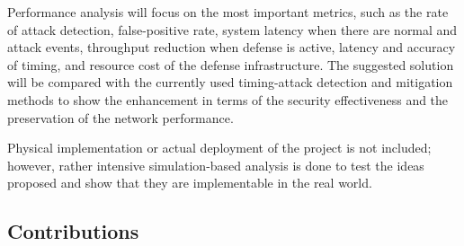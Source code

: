 Performance analysis will focus on the most important metrics, such as the rate of attack detection, false-positive rate, system latency when there are normal and attack events, throughput reduction when defense is active, latency and accuracy of timing, and resource cost of the defense infrastructure. The suggested solution will be compared with the currently used timing-attack detection and mitigation methods to show the enhancement in terms of the security effectiveness and the preservation of the network performance.

Physical implementation or actual deployment of the project is not included; however, rather intensive simulation-based analysis is done to test the ideas proposed and show that they are implementable in the real world.

\subsection{Contributions}

